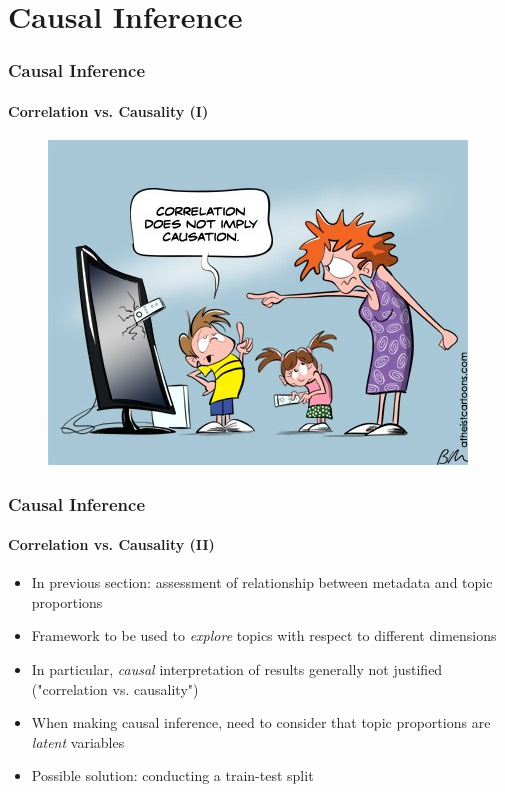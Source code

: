 \documentclass[xcolor=dvipsnames]{beamer}
\begin{document}
\section{Causal Inference}
\begin{frame}
\frametitle{Causal Inference}
\framesubtitle{Correlation vs. Causality (I)}
	\begin{figure}[h!]
  	\centering
  	\includegraphics[scale = 0.60]{../plots/presentation/correlation_causality.png}
	\end{figure}
\end{frame}

\begin{frame}
\frametitle{Causal Inference}
\framesubtitle{Correlation vs. Causality (II)}
\begin{itemize}
\item In previous section: assessment of relationship between metadata and topic proportions
\item Framework to be used to \textit{explore} topics with respect to different dimensions
\item In particular, \textit{causal} interpretation of results generally not justified ("correlation vs. causality")
\item When making causal inference, need to consider that topic proportions are \textit{latent} variables 
\item Possible solution: conducting a train-test split
\end{itemize}
\end{frame}
\end{document}
